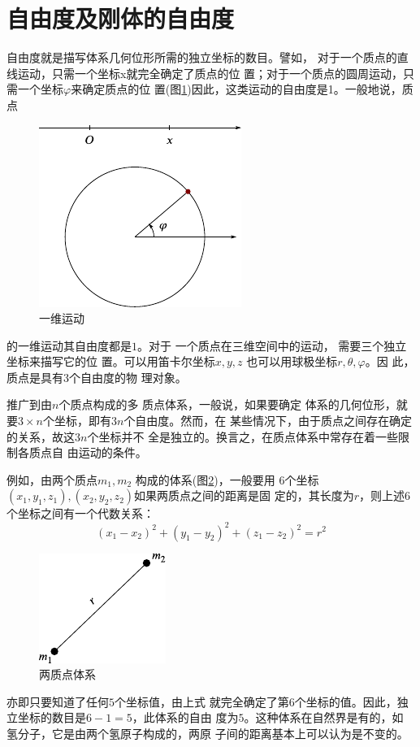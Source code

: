 \section{自由度及刚体的自由度}\label{sec:10.01}

自由度就是描写体系几何位形所需的独立坐标的数目。譬如，
对于一个质点的直线运动，只需一个坐标x就完全确定了质点的位
置；对于一个质点的圆周运动，只需一个坐标$ \varphi $来确定质点的位
置(图\ref{fig:10.01})因此，这类运动的自由度是1。一般地说，质点
\begin{figure}
    \centering
    \includegraphics{figure/fig10.01}
    \caption{一维运动}
    \label{fig:10.01}
\end{figure}
的一维运动其自由度都是$ 1 $。对于
一个质点在三维空间中的运动，
需要三个独立坐标来描写它的位
置。可以用笛卡尔坐标$ x,y,z $
也可以用球极坐标$ r, \theta , \varphi $。因
此，质点是具有$ 3 $个自由度的物
理对象。

推广到由$ n $个质点构成的多
质点体系，一般说，如果要确定
体系的几何位形，就要$ 3 \times n $个坐标，即有$ 3n $个自由度。然而，在
某些情况下，由于质点之间存在确定的关系，故这$ 3n $个坐标并不
全是独立的。换言之，在质点体系中常存在着一些限制各质点自
由运动的条件。

例如，由两个质点$ m _ 1, m _ { 2 }  $ 构成的体系(图\ref{fig:10.02})，一般要用
$ 6 $个坐标$  \left( x _ { 1 } , y _ { 1 } , z _ { 1 } \right) ,\left(x_2,y_2,z_2\right) $如果两质点之间的距离是固
定的，其长度为$ r $，则上述$ 6 $个坐标之间有一个代数关系：
\begin{equation}\label{eqn:10.01.01}
    \left( x _ { 1 } - x _ { 2 } \right) ^ { 2 } + \left( y _ { 1 } - y _ { 2 } \right) ^ { 2 } + \left( z _ { 1 } - z _ { 2 } \right) ^ { 2 } = r ^ { 2 }
\end{equation}
\begin{figure}
    \centering
    \includegraphics{figure/fig10.02}
    \caption{两质点体系}
    \label{fig:10.02}
\end{figure}
亦即只要知道了任何$ 5 $个坐标值，由上式
就完全确定了第$ 6 $个坐标的值。因此，独
立坐标的数目是$ 6-1=5 $，此体系的自由
度为$ 5 $。这种体系在自然界是有的，如
氢分子，它是由两个氢原子构成的，两原
子间的距离基本上可以认为是不变的。

